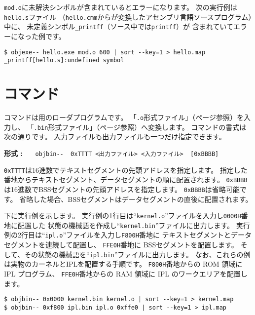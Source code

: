 \verb/mod.o/に未解決シンボルが含まれているとエラーになります。
次の実行例は\verb/hello.s/ファイル
（\verb/hello.cmm/から\cmmc が変換したアセンブリ言語ソースプログラム）中に、
未定義シンボル\verb/_printff/（\cmm ソース中では\verb/printff/）が
含まれていてエラーになった例です。

\begin{mylist}
\begin{verbatim}
$ objexe-- hello.exe mod.o 600 | sort --key=1 > hello.map
_printff[hello.s]:undefined symbol
\end{verbatim}
\end{mylist}

\section{{\objbin}コマンド}

{\objbin}コマンドは{\tac}用のローダプログラムです。
「\verb/.o/形式ファイル」（\pageref{app:oformat}ページ参照）を入力し、
「\verb/.bin/形式ファイル」（\pageref{app:bformat}ページ参照）へ変換します。
{\objbin}コマンドの書式は次の通りです。
入力ファイルも出力ファイルも一つだけ指定できます。

\begin{flushleft}
{\bf 形式 : }~~~\verb/objbin--  0xTTTT <出力ファイル> <入力ファイル>  [0xBBBB]/
\end{flushleft}

\verb/0xTTTT/は16進数でテキストセグメントの先頭アドレスを指定します。
指定した番地からテキストセグメント、データセグメントの順に配置されます。
\verb/0xBBBB/は16進数でBSSセグメントの先頭アドレスを指定します。
\verb/0xBBBB/は省略可能です。
省略した場合、BSSセグメントはデータセグメントの直後に配置されます。

下に実行例を示します。
実行例の1行目は``\verb/kernel.o/''ファイルを入力し\verb/0000H/番地に配置した
状態の機械語を作成し``\verb/kernel.bin/''ファイルに出力します。
実行例の2行目は``\verb/ipl.o/''ファイルを入力し\verb/F800H/番地に
テキストセグメントとデータセグメントを連続して配置し、
\verb/FFE0H/番地に BSSセグメントを配置します。
そして、その状態の機械語を``\verb/ipl.bin/''ファイルに出力します。
なお、これらの例は実物のカーネルとIPLを配置する手順です。
\verb/F800H/番地からの ROM 領域に IPL プログラム、
\verb/FFE0H/番地からの RAM 領域に IPL のワークエリアを配置します。

\begin{mylist}
\begin{verbatim}
$ objbin-- 0x0000 kernel.bin kernel.o | sort --key=1 > kernel.map
$ objbin-- 0xf800 ipl.bin ipl.o 0xffe0 | sort --key=1 > ipl.map
\end{verbatim}
\end{mylist}


